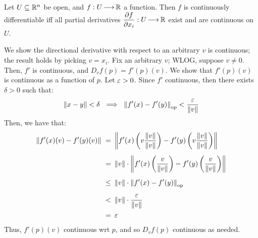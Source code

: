 \newpage
\begin{thm}[num=7.2,title=Differentiability Theorem]
    Let $ U \subseteq \mathbb{R}^{n} $ be open, and $ f:U \operatorname{\longrightarrow} \mathbb{R} $ a function.
    Then $ f $ is continuously differentiable iff all partial derivatives
    $ \dfrac{\partial f}{\partial x_{i}}:U \operatorname{\longrightarrow} \mathbb{R} $ exist and are continuous on $ U $.
\end{thm}

\begin{pf}[title=Forward direction]
    We show the directional derivative with respect to an arbitrary $ v $ is
    continuous; the result holds by picking $ v = x_{i} $. \vsp
    Fix an arbitrary $ v $; WLOG, suppose $ v \neq 0 $. Then, $ f' $ is
    continuous, and $ D_{v}f(p) = f'(p)(v) $. We show that $ f'(p)(v) $ is
    continuous as a function of $ p $.
    \vsp
    Let $ \operatorname{\varepsilon} > 0 $. Since $ f' $ continuous, then there exists $ \delta > 0 $
    such that:
    \begin{equation*}
        \norm{x-y} < \delta \ \implies \ \norm{f'(x)-f'(y)}_{\trm{op}} <
        \frac{\ep}{\norm{v}}
    \end{equation*}
    Then, we have that:
    \begin{align*}
        \norm{f'(x)(v)-f'(y)(v)} \ = \ & \norm{f'(x)\left( v\frac{\norm{v}}
        {\norm{v}} \right)-f'(y)\left( v\frac{\norm{v}}{\norm{v}} \right)} \vsp
        \ = \ & \norm{v}\cdot\norm{f'(x)\left( \frac{v}{\norm{v}} \right)-
        f'(y)\left( \frac{v}{\norm{v}} \right)} \vsp
        \ \leq \ & \norm{v}\cdot\norm{f'(x)-f'(y)}_{\trm{op}} \vsp
        \ < \ & \norm{v}\cdot\frac{\ep}{\norm{v}} \\
        \ = \ & \ep
    \end{align*}
    Thus, $ f'(p)(v) $ continuous wrt $ p $, and so $ D_{v}f(p) $ continuous as
    needed.
\end{pf}


